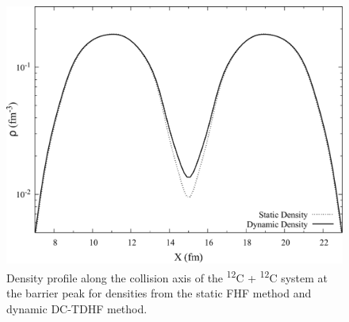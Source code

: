 \begin{figure}
	\includegraphics*[width=\textwidth]{../Figures/CC/DensityProfile.pdf}
	\caption{Density profile along the collision axis of the \textsuperscript{12}C + \textsuperscript{12}C system at the barrier peak for densities from the static FHF method and dynamic DC-TDHF method. }
	\label{fig:denstrace}
\end{figure}
